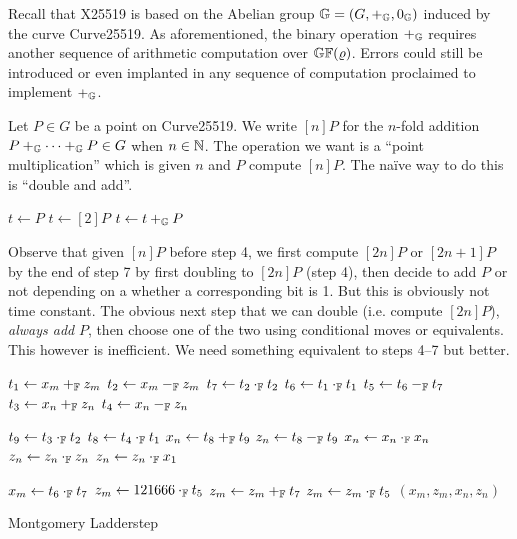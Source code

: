
Recall that X25519 is based on the Abelian group $\mathbb{G} = (G, +_{\mathbb{G}},
0_{\mathbb{G}})$ induced by the curve Curve25519. As aforementioned, the binary
operation $+_{\mathbb{G}}$ requires another sequence of arithmetic computation
over $\mathbb{GF}(\varrho)$. Errors could still be introduced or even
implanted in any sequence of computation proclaimed to implement $+_{\mathbb{G}}$.

Let $P \in G$ be a point on Curve25519. We write $[n]P$ for the
$n$-fold addition ${P +_{\mathbb{G}} \cdots +_{\mathbb{G}} P} \in G$ when $n \in \mathbb{N}$.
The operation we want is a ``point multiplication'' which is given $n$
and $P$ compute $[n]P$.  The na\"ive way to do this is ``double
and add''.  

\begin{algorithm}[h]
  \begin{algorithmic}[1]  
    \begin{multicols}{2}
      \State $t\leftarrow P$
      \State $t\leftarrow [2]P$
      \State $t\leftarrow t+_{\mathbb{G}} P$
      \EndIf
      \EndFor
      \State {}
      \EndFunction
    \end{multicols}
  \end{algorithmic}
\end{algorithm}
Observe that given $[n]P$ before step 4, we first compute $[2n]P$
or $[2n+1]P$ by the end of step 7 by first doubling to
$[2n]P$ (step 4), then decide to add $P$ or not depending on a
whether a corresponding bit is 1.  But this is obviously not time
constant.  The obvious next step that we can double
(i.e. compute $[2n]P$), \emph{always add} $P$, then choose one
of the two using conditional moves or equivalents.  This however is
inefficient.  We need something equivalent to steps 4--7 but better.

\begin{algorithm}[h]
\label{evaluation:ladder-step:montgomery}
\begin{algorithmic}[1]
\begin{multicols}{3}
\State $t_1 \leftarrow x_m +_{\mathbb{F}} z_m$
\State $t_2 \leftarrow x_m -_{\mathbb{F}} z_m$
\State $t_7 \leftarrow t_2 \cdot_{\mathbb{F}} t_2$
\State $t_6 \leftarrow t_1 \cdot_{\mathbb{F}} t_1$
\State $t_5 \leftarrow t_6 -_{\mathbb{F}} t_7$
\State $t_3 \leftarrow x_n +_{\mathbb{F}} z_n$
\State $t_4 \leftarrow x_n -_{\mathbb{F}} z_n$\rule{0ex}{0ex}
\State $t_9 \leftarrow t_3 \cdot_{\mathbb{F}} t_2$
\State $t_8 \leftarrow t_4 \cdot_{\mathbb{F}} t_1$
\State $x_n \leftarrow t_8 +_{\mathbb{F}} t_9$
\State $z_n \leftarrow t_8 -_{\mathbb{F}} t_9$
\State $x_n \leftarrow x_{n} \cdot_{\mathbb{F}} x_{n}$
\State $z_n \leftarrow z_{n} \cdot_{\mathbb{F}} z_{n}$
\State $z_n \leftarrow z_{n} \cdot_{\mathbb{F}} x_1$\rule{0ex}{0ex} 
\State $x_m \leftarrow t_6 \cdot_{\mathbb{F}} t_7$
\State $z_m \leftarrow 121666 \cdot_{\mathbb{F}} t_5$
\State $z_m \leftarrow z_m +_{\mathbb{F}} t_7$
\State $z_m \leftarrow z_m \cdot_{\mathbb{F}} t_5$
\State \Return $(x_m, z_m, x_n, z_n)$
\EndFunction
\end{multicols}
\end{algorithmic}
\caption{Montgomery Ladderstep}
\end{algorithm}


